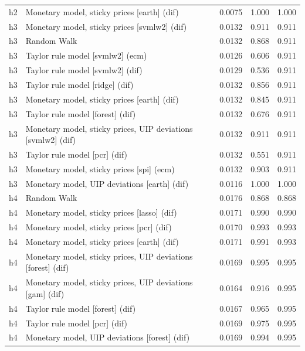 \begin{ThreePartTable}
\begin{longtable}[t]{cp{5.5cm}ccc}
h2 & \raggedright Monetary model, sticky prices [earth] (dif) & 0.0075 & 1.000 & 1.000\\
\addlinespace
h3 & \raggedright Monetary model, sticky prices [svmlw2] (dif) & 0.0132 & 0.911 & 0.911\\
h3 & \raggedright Random Walk & 0.0132 & 0.868 & 0.911\\
h3 & \raggedright Taylor rule model [svmlw2] (ecm) & 0.0126 & 0.606 & 0.911\\
h3 & \raggedright Taylor rule model [svmlw2] (dif) & 0.0129 & 0.536 & 0.911\\
h3 & \raggedright Taylor rule model [ridge] (dif) & 0.0132 & 0.856 & 0.911\\
h3 & \raggedright Monetary model, sticky prices [earth] (dif) & 0.0132 & 0.845 & 0.911\\
h3 & \raggedright Taylor rule model [forest] (dif) & 0.0132 & 0.676 & 0.911\\
h3 & \raggedright Monetary model, sticky prices, UIP deviations [svmlw2] (dif) & 0.0132 & 0.911 & 0.911\\
h3 & \raggedright Taylor rule model [pcr] (dif) & 0.0132 & 0.551 & 0.911\\
h3 & \raggedright Monetary model, sticky prices [spi] (ecm) & 0.0132 & 0.903 & 0.911\\
h3 & \raggedright Monetary model, UIP deviations [earth] (dif) & 0.0116 & 1.000 & 1.000\\
\addlinespace
h4 & \raggedright Random Walk & 0.0176 & 0.868 & 0.868\\
h4 & \raggedright Monetary model, sticky prices [lasso] (dif) & 0.0171 & 0.990 & 0.990\\
h4 & \raggedright Monetary model, sticky prices [pcr] (dif) & 0.0170 & 0.993 & 0.993\\
h4 & \raggedright Monetary model, sticky prices [earth] (dif) & 0.0171 & 0.991 & 0.993\\
h4 & \raggedright Monetary model, sticky prices, UIP deviations [forest] (dif) & 0.0169 & 0.995 & 0.995\\
h4 & \raggedright Monetary model, sticky prices, UIP deviations [gam] (dif) & 0.0164 & 0.916 & 0.995\\
h4 & \raggedright Taylor rule model [forest] (dif) & 0.0167 & 0.965 & 0.995\\
h4 & \raggedright Taylor rule model [pcr] (dif) & 0.0169 & 0.975 & 0.995\\
h4 & \raggedright Monetary model, UIP deviations [forest] (dif) & 0.0169 & 0.994 & 0.995\\

\end{longtable}
\end{ThreePartTable}
